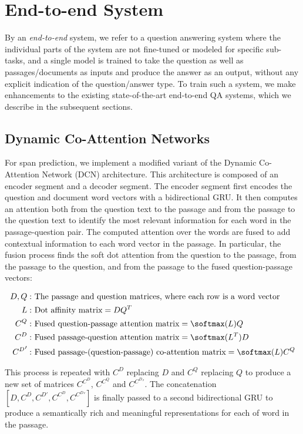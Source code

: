 \section{End-to-end System}

By an \textit{end-to-end} system, we refer to a question answering system where the individual parts of the system are not fine-tuned or modeled for specific sub-tasks, and a single model is trained to take the question as well as passages/documents as inputs and produce the answer as an output, without any explicit indication of the question/answer type. To train such a system, we make enhancements to the existing state-of-the-art end-to-end QA systems, which we describe in the subsequent sections.

\subsection{Dynamic Co-Attention Networks}

For span prediction, we implement a modified variant of the Dynamic Co-Attention Network (DCN) architecture. This architecture is composed of an encoder segment and a decoder segment. The encoder segment first encodes the question and document word vectors with a bidirectional GRU. It then computes an attention both from the question text to the passage and from the passage to the question text to identify the most relevant information for each word in the passage-question pair. The computed attention over the words are fused to add contextual information to each word vector in the passage. In particular, the fusion process finds the soft dot attention from the question to the passage, from the passage to the question, and from the passage to the fused question-passage vectors:

\begin{align*}
D, Q: &\text{ The passage and question matrices, where each row is a word vector} \\
L: &\text{ Dot affinity matrix} = D Q^T \\
C^Q: &\text{ Fused question-passage attention matrix} = \softmax(L) Q \\
C^D: &\text{ Fused passage-question attention matrix} = \softmax(L^T) D \\
{C^D}': &\text{ Fused passage-(question-passage) co-attention matrix} = \softmax(L) C^Q \\
\end{align*}

This process is repeated with $C^D$ replacing $D$ and $C^Q$ replacing $Q$ to produce a new set of matrices $C^{C^D}$, $C^{C^Q}$ and $C^{C^D \prime}$. The concatenation $[D, C^D, C^{D \prime}, C^{C^D}, C^{C^D \prime}]$ is finally passed to a second bidirectional GRU to produce a semantically rich and meaningful representations for each of word in the passage.

